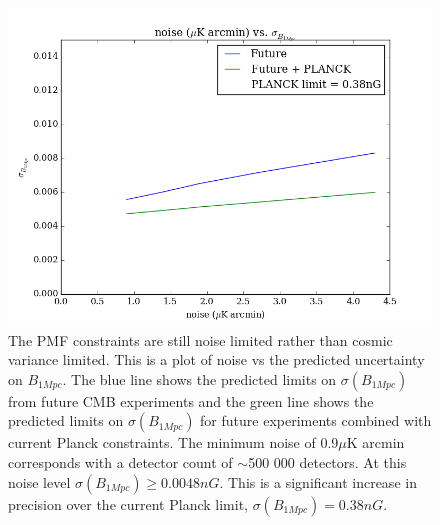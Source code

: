 \begin{figure}[h]
\centering
\includegraphics[scale=0.7]{images/noise.png}
\caption{The PMF constraints are still noise limited rather than cosmic variance limited. This is a plot of noise vs the predicted uncertainty on $B_{1Mpc}$. The blue line shows the predicted limits on $\sigma(B_{1Mpc})$ from future CMB experiments and the green line shows the predicted limits on $\sigma(B_{1Mpc})$ for future experiments combined with current Planck constraints. The minimum noise of 0.9$\mu$K arcmin corresponds with a detector count of $\sim$500 000 detectors. At this noise level $\sigma(B_{1Mpc}) \geq 0.0048nG$. This is a significant increase in precision over the current Planck limit, $\sigma(B_{1Mpc}) = 0.38nG$.}
\label{fig:noise}
\end{figure}

